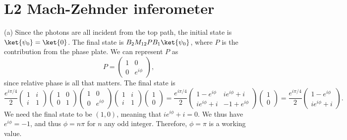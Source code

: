 \documentclass[11pt, letterpaper]{article}
\theoremstyle{plain}
\begin{document}
\section{L2 Mach-Zehnder inferometer}
(a) Since the photons are all incident from the top path, the initial state is $\ket{\psi _0}=\ket{0}$. The final state is $B_2M_{12} PB_1\ket{\psi _0}$, where $P$ is the contribution from the phase plate. We can represent $P$ as
\[
	P=\begin{pmatrix}
	1 & 0 \\
	0 & e^{i\phi } 
	\end{pmatrix}
,\]
since relative phase is all that matters. The final state is
\[
	\frac{e^{i\pi /4} }{2} \begin{pmatrix}
	1 & i \\
	i & 1
	\end{pmatrix}\begin{pmatrix}
	1 & 0 \\
	0 & 1
	\end{pmatrix}\begin{pmatrix}
	1 & 0 \\
	0 & e^{i\phi } 
	\end{pmatrix}\begin{pmatrix}
	1 & i \\
	i & 1
	\end{pmatrix}\begin{pmatrix}
	1 \\
	0
	\end{pmatrix}=\frac{e^{i\pi /4} }{2}\begin{pmatrix}
	1-e^{i\phi }  & ie^{i\phi } +i \\
	ie^{i\phi } +i & -1+e^{i\phi } 
	\end{pmatrix}\begin{pmatrix}
	1 \\
	0
	\end{pmatrix}=\frac{e^{i\pi /4} }{2} \begin{pmatrix}
	1-e^{i\phi }  \\
	ie^{i\phi } +i
	\end{pmatrix}
.\]
We need the final state to be $(1,0)$, meaning that $ie^{i\phi } +i=0$. We thus have $e^{i\phi } =-1$, and thus $\phi =n\pi $ for $n$ any odd integer. Therefore, $\phi =\pi $ is a working value.
\end{document}
